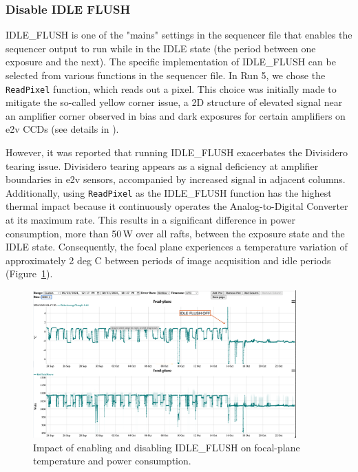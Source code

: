 \subsubsection{Disable IDLE FLUSH}\label{section:disablingIDLEFLUSH}

IDLE\_FLUSH is one of the "mains" settings in the sequencer file that enables the sequencer output to run while in the IDLE state (the period between one exposure and the next). The specific implementation of IDLE\_FLUSH can be selected from various functions in the sequencer file. In Run 5, we chose the \texttt{ReadPixel} function, which reads out a pixel. This choice was initially made to mitigate the so-called yellow corner issue, a 2D structure of elevated signal near an amplifier corner observed in bias and dark exposures for certain amplifiers on e2v CCDs (see details in \citet{2024SPIE13103E..0WU}).

However, it was reported that running IDLE\_FLUSH exacerbates the Divisidero tearing issue. Divisidero tearing appears as a signal deficiency at amplifier boundaries in e2v sensors, accompanied by increased signal in adjacent columns. Additionally, using \texttt{ReadPixel} as the IDLE\_FLUSH function has the highest thermal impact because it continuously operates the Analog-to-Digital Converter at its maximum rate. This results in a significant difference in power consumption, more than 50\,W over all rafts, between the exposure state and the IDLE state. Consequently, the focal plane experiences a temperature variation of approximately 2 deg C between periods of image acquisition and idle periods (Figure~\ref{fig:IdleFlushEffect}).

\begin{figure}[ht]
\begin{centering}
\includegraphics[width=0.9\textwidth]{figures/REB_power_temp6_sept24_to_Oct23.png}
\end{centering}
\caption{Impact of enabling and disabling IDLE\_FLUSH on focal-plane temperature and power consumption.}\label{fig:IdleFlushEffect}
\end{figure}


